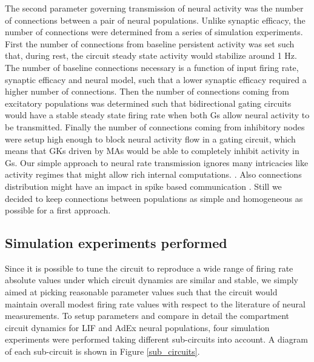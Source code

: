 \documentclass[10pt]{article}
\begin{document}
The second parameter governing transmission of neural activity was the number of connections between a pair of neural populations.
Unlike synaptic efficacy, the number of connections were determined from a series of simulation experiments.
First the number of connections from baseline persistent activity was set such that, during rest, the circuit steady state activity would stabilize around 1 Hz.
The number of baseline connections necessary is a function of input firing rate, synaptic efficacy and neural model, such that a lower synaptic efficacy required a higher number of connections.
Then the number of connections coming from excitatory populations was determined such that bidirectional gating circuits would have a stable steady state firing rate when both Gs allow neural activity to be transmitted.
Finally the number of connections coming from inhibitory nodes were setup high enough to block neural activity flow in a gating circuit, which means that GKs driven by MAs would be able to completely inhibit activity in Gs.
Our simple approach to neural rate transmission ignores many intricacies like activity regimes that might allow rich internal computations.
\cite{Ostojic_2014}.
Also connections distribution might have an impact in spike based communication \cite{Teramae_2012}.
Still we decided to keep connections between populations as simple and homogeneous as possible for a first approach.

\subsection{Simulation experiments performed}\label{simulation-experiments-performed}

Since it is possible to tune the circuit to reproduce a wide range of firing rate absolute values under which circuit dynamics are similar and stable, we simply aimed at picking reasonable parameter values such that the circuit would maintain overall modest firing rate values with respect to the literature of neural measurements.
To setup parameters and compare in detail the compartment circuit dynamics for LIF and AdEx neural populations, four simulation experiments were performed taking different sub-circuits into account.
A diagram of each sub-circuit is shown in Figure \ref{sub_circuits}.
\end{document}
